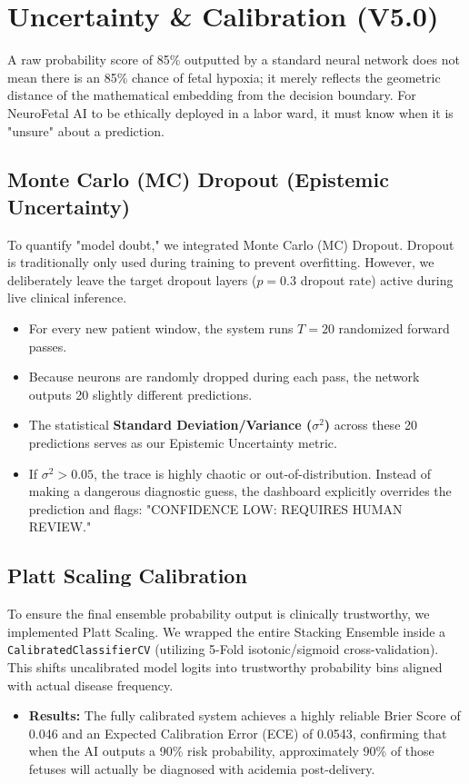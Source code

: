\documentclass[12pt,a4paper]{report}
\begin{document}
\chapter{Uncertainty \& Calibration (V5.0)}
A raw probability score of 85\% outputted by a standard neural network does not mean there is an 85\% chance of fetal hypoxia; it merely reflects the geometric distance of the mathematical embedding from the decision boundary. For NeuroFetal AI to be ethically deployed in a labor ward, it must know when it is "unsure" about a prediction.

\section{Monte Carlo (MC) Dropout (Epistemic Uncertainty)}
To quantify "model doubt," we integrated Monte Carlo (MC) Dropout. Dropout is traditionally only used during training to prevent overfitting. However, we deliberately leave the target dropout layers ($p=0.3$ dropout rate) active during live clinical inference. 
\begin{itemize}
    \item For every new patient window, the system runs $T=20$ randomized forward passes. 
    \item Because neurons are randomly dropped during each pass, the network outputs 20 slightly different predictions.
    \item The statistical \textbf{Standard Deviation/Variance ($\sigma^2$)} across these 20 predictions serves as our Epistemic Uncertainty metric. 
    \item If $\sigma^2 > 0.05$, the trace is highly chaotic or out-of-distribution. Instead of making a dangerous diagnostic guess, the dashboard explicitly overrides the prediction and flags: "CONFIDENCE LOW: REQUIRES HUMAN REVIEW."
\end{itemize}

\section{Platt Scaling Calibration}
To ensure the final ensemble probability output is clinically trustworthy, we implemented Platt Scaling. We wrapped the entire Stacking Ensemble inside a \texttt{CalibratedClassifierCV} (utilizing 5-Fold isotonic/sigmoid cross-validation). This shifts uncalibrated model logits into trustworthy probability bins aligned with actual disease frequency.
\begin{itemize}
    \item \textbf{Results:} The fully calibrated system achieves a highly reliable Brier Score of 0.046 and an Expected Calibration Error (ECE) of 0.0543, confirming that when the AI outputs a 90\% risk probability, approximately 90\% of those fetuses will actually be diagnosed with acidemia post-delivery.
\end{itemize}
\end{document}
